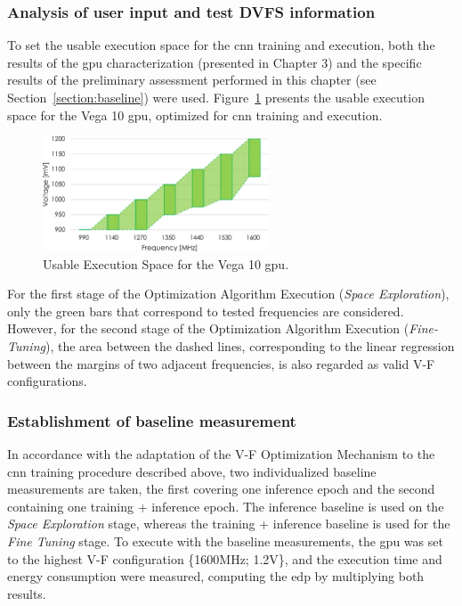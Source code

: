 \subsubsection{Analysis of user input and test DVFS information}

To set the usable execution space for the \acrshort{cnn} training and execution, both the results of the \acrshort{gpu} characterization (presented in Chapter 3) and the specific results of the preliminary assessment performed in this chapter (see Section~\ref{section:baseline}) were used. Figure~\ref{fig:ues} presents the usable execution space for the Vega 10 \acrshort{gpu}, optimized for  \acrshort{cnn} training and execution.

\begin{figure}[htb]
    \centering
        \includegraphics[width=0.6\textwidth]{Figures/Application To Deep Learning/UES.pdf}
        \caption{Usable Execution Space for the Vega 10 \acrshort{gpu}.}
    \label{fig:ues}
\end{figure}



For the first stage of the Optimization Algorithm Execution (\textit{Space Exploration}), only the green bars that correspond to tested frequencies are considered. However, for the second stage of the Optimization Algorithm Execution (\textit{Fine-Tuning}), the area between the dashed lines, corresponding to the linear regression between the margins of two adjacent frequencies, is also regarded as valid V-F configurations.

\subsubsection{Establishment of baseline measurement}

In accordance with the adaptation of the V-F Optimization Mechanism to the \acrshort{cnn} training procedure described above, two individualized baseline measurements are taken, the first covering one inference epoch and the second containing one training + inference epoch. The inference baseline is used on the \textit{Space Exploration} stage, whereas the training + inference baseline is used for the \textit{Fine Tuning} stage. To execute with the baseline measurements, the \acrshort{gpu} was set to the highest V-F configuration \{1600MHz; 1.2V\}, and the execution time and energy consumption were measured, computing the \acrshort{edp} by multiplying both results.





